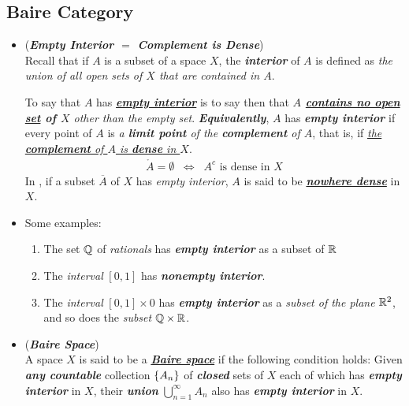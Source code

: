 \documentclass[11pt]{article}
\begin{document}
\subsection{Baire Category}
\begin{itemize}
\item \begin{remark} (\emph{\textbf{Empty Interior $=$ Complement is Dense}}) \\
Recall that if $A$ is a subset of a space $X$, the \emph{\textbf{interior}} of $A$ is defined as \emph{the union of all open sets of $X$ that are contained in $A$}. 

To say that $A$ has \underline{\emph{\textbf{empty interior}}} is to say then that \emph{\textbf{$A$ \underline{contains no open set} of $X$} other than the empty set}. \emph{\textbf{Equivalently}}, $A$ has \emph{\textbf{empty interior}} if every point of $A$ is \emph{a \textbf{limit point} of the \textbf{complement} of $A$}, that is, if \underline{\emph{the \textbf{complement} of $A$ is \textbf{dense} in $X$}}.
\begin{align*}
\mathring{A} = \emptyset \;\; \Leftrightarrow \;\; A^{c}\text{ is dense in }X
\end{align*} In \citep{reed1980methods}, if a subset $\overline{A}$ of $X$ has \emph{empty interior}, $A$ is said to be \underline{\emph{\textbf{nowhere dense}}} in $X$.
\end{remark}

\item \begin{example} 
Some  examples:
\begin{enumerate}
\item The set ${\mathbb Q}$ of \emph{rationals} has \emph{\textbf{empty interior}} as a subset of ${\mathbb R}$
\item The \emph{interval} $[0, 1]$ has \emph{\textbf{nonempty interior}}. 
\item The \emph{interval} $[0, 1] \times 0$ has \emph{\textbf{empty interior}} as a \emph{subset of the plane} ${\mathbb R}^2$, and so does the \emph{subset} ${\mathbb Q} \times {\mathbb R}$.
\end{enumerate}
\end{example}

\item \begin{definition} (\emph{\textbf{Baire Space}})\\
A space $X$ is said to be a \underline{\emph{\textbf{Baire space}}} if the following condition holds:  Given  \emph{\textbf{any countable}} collection $\left\{A_n\right\}$ of \emph{\textbf{closed}} sets of $X$ each of which has \emph{\textbf{empty interior}} in $X$, their \emph{\textbf{union}}  $\bigcup_{n=1}^{\infty} A_n$ also has \emph{\textbf{empty interior}} in $X$.
\end{definition}


\end{itemize}
\end{document}
